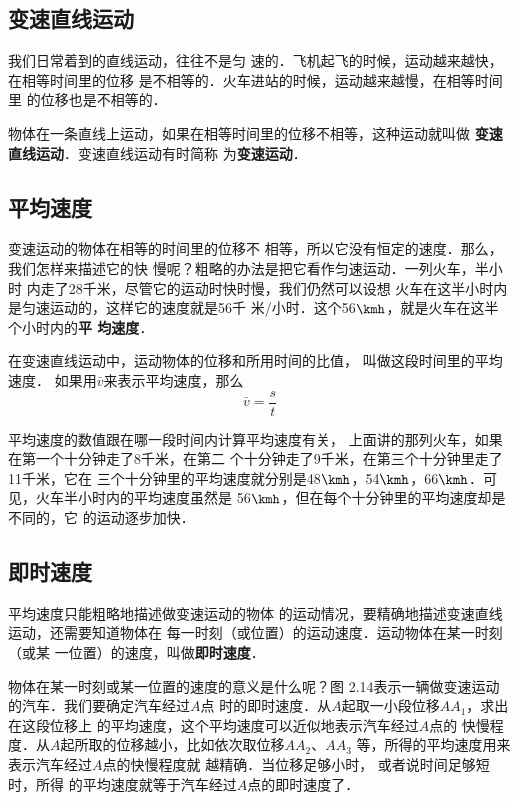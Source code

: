     \subsection{变速直线运动}
    
    我们日常着到的直线运动，往往不是匀
速的．飞机起飞的时候，运动越来越快，在相等时间里的位移
是不相等的．火车进站的时候，运动越来越慢，在相等时间里
的位移也是不相等的．

物体在一条直线上运动，如果在相等时间里的位移不相等，这种运动就叫做
\textbf{变速直线运动}．变速直线运动有时简称
为\textbf{变速运动}．

\subsection{平均速度}

变速运动的物体在相等的时间里的位移不
相等，所以它没有恒定的速度．那么，我们怎样来描述它的快
慢呢？粗略的办法是把它看作匀速运动．一列火车，半小时
内走了28千米，尽管它的运动时快时慢，我们仍然可以设想
火车在这半小时内是匀速运动的，这样它的速度就是56千
米/小时．这个56$\kmh$，就是火车在这半个小时内的\textbf{平
均速度}．

在变速直线运动中，运动物体的位移和所用时间的比值，
叫做这段时间里的平均速度．
如果用$\bar v$来表示平均速度，那么
\[\bar v=\frac{s}{t}\]

平均速度的数值跟在哪一段时间内计算平均速度有关，
上面讲的那列火车，如果在第一个十分钟走了8千米，在第二
个十分钟走了9千米，在第三个十分钟里走了11千米，它在
三个十分钟里的平均速度就分别是48$\kmh$，54$\kmh$，66$\kmh$．可见，火车半小时内的平均速度虽然是
56$\kmh$，但在每个十分钟里的平均速度却是不同的，它
的运动逐步加快．

\subsection{即时速度}
平均速度只能粗略地描述做变速运动的物体
的运动情况，要精确地描述变速直线运动，还需要知道物体在
每一时刻（或位置）的运动速度．运动物体在某一时刻（或某
一位置）的速度，叫做\textbf{即时速度}．

物体在某一时刻或某一位置的速度的意义是什么呢？图
2.14表示一辆做变速运动的汽车．我们要确定汽车经过$A$点
时的即时速度．从$A$起取一小段位移$AA_1$，求出在这段位移上
的平均速度，这个平均速度可以近似地表示汽车经过$A$点的
快慢程度．从$A$起所取的位移越小，比如依次取位移$AA_2$、$AA_3$
等，所得的平均速度用来表示汽车经过$A$点的快慢程度就
越精确．当位移足够小时，
或者说时间足够短时，所得
的平均速度就等于汽车经过$A$点的即时速度了．

